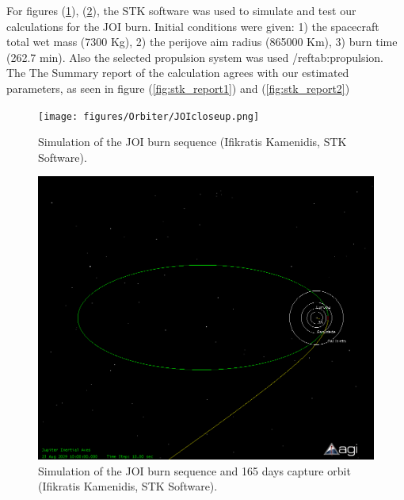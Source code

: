 \noindent
For figures (\ref{fig:joicloseup}), (\ref{fig:joifull}), the STK software was used to simulate and test our calculations for the JOI burn. Initial conditions were given: 1) the spacecraft total wet mass (7300 Kg), 2) the perijove aim radius (865000 Km), 3) burn time (262.7 min). Also the selected propulsion system was used /ref{tab:propulsion}. The The Summary report of the calculation agrees with our estimated parameters, as seen in figure (\ref{fig:stk_report1}) and (\ref{fig:stk_report2})

\begin{figure}[htb!]
\centering
\texttt{[image: figures/Orbiter/JOIcloseup.png]}
\caption{Simulation of the JOI burn sequence (Ifikratis Kamenidis, STK Software).}
\label{fig:joicloseup}
\end{figure}

\begin{figure}[htb!]
\centering
\includegraphics[scale=0.4]{figures/Orbiter/JOIfull.png}
\caption{Simulation of the JOI burn sequence and 165 days capture orbit (Ifikratis Kamenidis, STK Software).}
\label{fig:joifull}
\end{figure}

